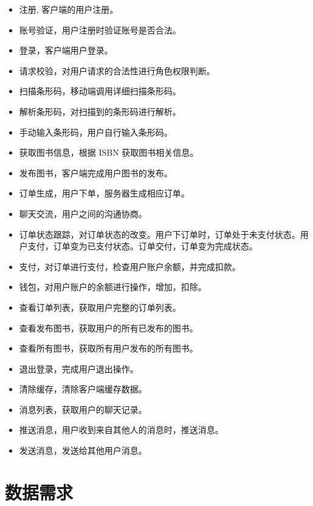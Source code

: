 \begin{itemize}
	\item 注册, 客户端的用户注册。
	\item 账号验证，用户注册时验证账号是否合法。
	\item 登录，客户端用户登录。
	\item 请求校验，对用户请求的合法性进行角色权限判断。
	\item 扫描条形码，移动端调用详细扫描条形码。
	\item 解析条形码，对扫描到的条形码进行解析。
	\item 手动输入条形码，用户自行输入条形码。
	\item 获取图书信息，根据 ISBN 获取图书相关信息。
	\item 发布图书，客户端完成用户图书的发布。
	\item 订单生成，用户下单，服务器生成相应订单。
	\item 聊天交流，用户之间的沟通协商。
	\item 订单状态跟踪，对订单状态的改变。用户下订单时，订单处于未支付状态。用户支付，订单变为已支付状态。订单交付，订单变为完成状态。
	\item 支付，对订单进行支付，检查用户账户余额，并完成扣款。
	\item 钱包，对用户账户的余额进行操作，增加，扣除。
	\item 查看订单列表，获取用户完整的订单列表。
	\item 查看发布图书，获取用户的所有已发布的图书。
	\item 查看所有图书，获取所有用户发布的所有图书。
	\item 退出登录，完成用户退出操作。
	\item 清除缓存，清除客户端缓存数据。
	\item 消息列表，获取用户的聊天记录。
	\item 推送消息，用户收到来自其他人的消息时，推送消息。
	\item 发送消息，发送给其他用户消息。
\end{itemize}

\section{数据需求}

